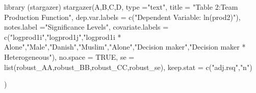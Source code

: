 \documentclass[
]{article}
\newenvironment{Shaded}{\begin{snugshade}}{\end{snugshade}}
\newcommand{\AttributeTok}[1]{\textcolor[rgb]{0.77,0.63,0.00}{#1}}
\newcommand{\ConstantTok}[1]{\textcolor[rgb]{0.00,0.00,0.00}{#1}}
\newcommand{\FunctionTok}[1]{\textcolor[rgb]{0.00,0.00,0.00}{#1}}
\newcommand{\NormalTok}[1]{#1}
\newcommand{\StringTok}[1]{\textcolor[rgb]{0.31,0.60,0.02}{#1}}
\begin{document}
\begin{Shaded}
\begin{Highlighting}[]
\FunctionTok{library}\NormalTok{ (stargazer)}
\FunctionTok{stargazer}\NormalTok{(A,B,C,D, }\AttributeTok{type =}\StringTok{"text"}\NormalTok{,}
          \AttributeTok{title =} \StringTok{"Table 2:Team Production Function"}\NormalTok{,}
          \AttributeTok{dep.var.labels =} \FunctionTok{c}\NormalTok{(}\StringTok{"Dependent Variable: ln(prod2)"}\NormalTok{),}
          \AttributeTok{notes.label =}\StringTok{"Significance Levels"}\NormalTok{,}
          \AttributeTok{covariate.labels =} \FunctionTok{c}\NormalTok{(}\StringTok{"logprod1i"}\NormalTok{,}\StringTok{"logprod1j"}\NormalTok{,}\StringTok{"logprod1i * Alone"}\NormalTok{,}\StringTok{"Male"}\NormalTok{,}\StringTok{"Danish"}\NormalTok{,}\StringTok{"Muslim"}\NormalTok{,}\StringTok{"Alone"}\NormalTok{,}\StringTok{"Decision maker"}\NormalTok{,}\StringTok{"Decision maker * Heterogeneous"}\NormalTok{),}
          \AttributeTok{no.space =} \ConstantTok{TRUE}\NormalTok{,}
          \AttributeTok{se =} \FunctionTok{list}\NormalTok{(robust\_AA,robust\_BB,robust\_CC,robust\_se),}
          \AttributeTok{keep.stat =} \FunctionTok{c}\NormalTok{(}\StringTok{"adj.rsq"}\NormalTok{,}\StringTok{"n"}\NormalTok{)}
          
\NormalTok{          )}
\end{Highlighting}
\end{Shaded}
\end{document}
